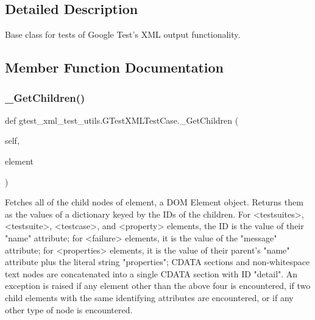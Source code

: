 \subsection{Detailed Description}
\begin{DoxyVerb}Base class for tests of Google Test's XML output functionality.
\end{DoxyVerb}
 

\subsection{Member Function Documentation}
\mbox{\label{classgtest__xml__test__utils_1_1_g_test_x_m_l_test_case_a7f487435d29e1b2300af000d36ff4f5e}} 
\subsubsection{\texorpdfstring{\_GetChildren()}{\_GetChildren()}}
{\footnotesize\ttfamily def gtest\+\_\+xml\+\_\+test\+\_\+utils.\+G\+Test\+X\+M\+L\+Test\+Case.\+\_\+\+Get\+Children (\begin{DoxyParamCaption}\item[{}]{self,  }\item[{}]{element }\end{DoxyParamCaption})\hspace{0.3cm}{\ttfamily [private]}}

\begin{DoxyVerb}Fetches all of the child nodes of element, a DOM Element object.
Returns them as the values of a dictionary keyed by the IDs of the
children.  For <testsuites>, <testsuite>, <testcase>, and <property>
elements, the ID is the value of their "name" attribute; for <failure>
elements, it is the value of the "message" attribute; for <properties>
elements, it is the value of their parent's "name" attribute plus the
literal string "properties"; CDATA sections and non-whitespace
text nodes are concatenated into a single CDATA section with ID
"detail".  An exception is raised if any element other than the above
four is encountered, if two child elements with the same identifying
attributes are encountered, or if any other type of node is encountered.
\end{DoxyVerb}
 \mbox{\label{classgtest__xml__test__utils_1_1_g_test_x_m_l_test_case_a977273e8863f4f41d121bb5a64b08d32}} 
